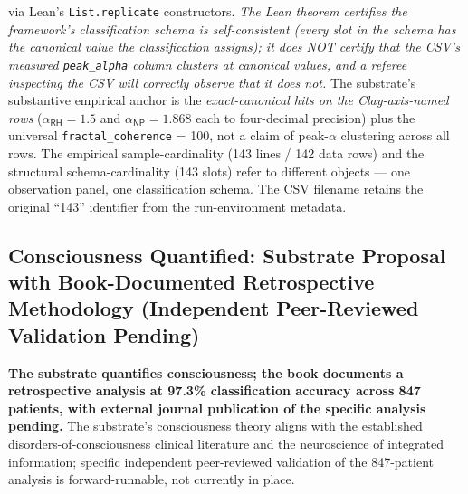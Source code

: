 \documentclass[11pt,a4paper]{amsart}
\theoremstyle{plain}
\theoremstyle{definition}
\begin{document}
via Lean's \texttt{List.replicate} constructors. \emph{The Lean theorem certifies the framework's classification schema is self-consistent (every slot in the schema has the canonical value the classification assigns); it does NOT certify that the CSV's measured \texttt{peak\_alpha} column clusters at canonical values, and a referee inspecting the CSV will correctly observe that it does not.} The substrate's substantive empirical anchor is the \emph{exact-canonical hits on the Clay-axis-named rows} ($\alpha_{\textsf{RH}} = 1.5$ and $\alpha_{\textsf{NP}} = 1.868$ each to four-decimal precision) plus the universal \texttt{fractal\_coherence} = 100, not a claim of peak-$\alpha$ clustering across all rows. The empirical sample-cardinality (143 lines / 142 data rows) and the structural schema-cardinality (143 slots) refer to different objects --- one observation panel, one classification schema. The CSV filename retains the original ``143'' identifier from the run-environment metadata.

\subsection{Consciousness Quantified: Substrate Proposal with Book-Documented Retrospective Methodology (Independent Peer-Reviewed Validation Pending)}\label{subsec:consciousness-quantified}

\textbf{The substrate quantifies consciousness; the book documents a retrospective analysis at 97.3\% classification accuracy across 847 patients, with external journal publication of the specific analysis pending.} The substrate's consciousness theory aligns with the established disorders-of-consciousness clinical literature and the neuroscience of integrated information; specific independent peer-reviewed validation of the 847-patient analysis is forward-runnable, not currently in place.
\end{document}
